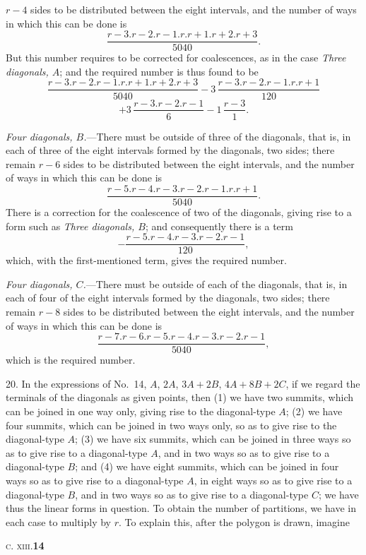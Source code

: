 \documentclass[11pt]{article}
\begin{document}
\smallskip
$r-4$ sides to be distributed between the eight intervals, and the number of
ways in which this can be done is
\[
\frac{r-3.r-2.r-1.r.r+1.r+2.r+3}{5040}.
\]
But this number requires to be corrected for coalescences, as in the case
\emph{Three diagonals, $A$}; and the required number is thus found to be
\[
\frac{r-3.r-2.r-1.r.r+1.r+2.r+3}{5040}-3\,\frac{r-3.r-2.r-1.r.r+1}{120}
\]
\[
+3\,\frac{r-3.r-2.r-1}{6}-1\,\frac{r-3}{1}.
\]

\hspace{1em} \emph{Four diagonals, $B$.}---There must be outside of three of
the diagonals, that is, in each of three of the eight intervals formed by
the diagonals, two sides; there remain $r-6$ sides to be distributed between
the eight intervals, and the number of ways in which this can be done is
\[
\frac{r-5.r-4.r-3.r-2.r-1.r.r+1}{5040}.
\]
There is a correction for the coalescence of two of the diagonals, giving
rise to a form such as \emph{Three diagonals, $B$}; and consequently there is
a term
\[
-\frac{r-5.r-4.r-3.r-2.r-1}{120},
\]
which, with the first-mentioned term, gives the required number.

\hspace{1em} \emph{Four diagonals, $C$.}---There must be outside of each of
the diagonals, that is, in each of four of the eight intervals formed by the
diagonals, two sides; there remain $r-8$ sides to be distributed between the
eight intervals, and the number of ways in which this can be done is
\[
\frac{r-7.r-6.r-5.r-4.r-3.r-2.r-1}{5040},
\]
which is the required number.

\hspace{1em} 20. In the expressions of No.~14, $A$, $2A$, $3A+2B$,
$4A+8B+2C$, if we regard the terminals of the diagonals as given points, then
(1) we have two summits, which can be joined in one way only, giving rise to
the diagonal-type $A$; (2) we have four summits, which can be joined in two
ways only, so as to give rise to the diagonal-type $A$; (3) we have six
summits, which can be joined in three ways so as to give rise to a
diagonal-type $A$, and in two ways so as to give rise to a diagonal-type
$B$; and (4) we have eight summits, which can be joined in four ways so as
to give rise to a diagonal-type $A$, in eight ways so as to give rise to a
diagonal-type $B$, and in two ways so as to give rise to a diagonal-type
$C$; we have thus the linear forms in question. To obtain the number of
partitions, we have in each case to multiply by $r$. To explain this, after
the polygon is drawn, imagine

\hfill\textsc{c. xiii.}\hfill\textbf{14}
\end{document}
